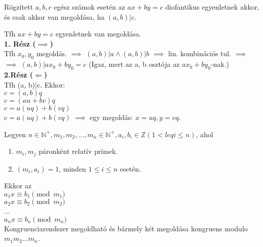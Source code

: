 \documentclass{beamer}
\begin{document}
\begin{frame}

\begin{tcolorbox}[title={Tétel: A diofantikus egyenlet megoldása}]
Rögzített $a, b, c$ egész számok esetén az \textbf{$ax + by = c$} diofantikus egyenletnek akkor, és csak akkor van megoldása, ha $(a, b)|c$.
\end{tcolorbox}

\begin{tcolorbox}[title={Bizonyítás}]
Tfh $ax + by = c$ egyenletnek van megoldása.\\
\textbf{1. Rész ($\implies$)}\\
\smallskip
Tfh $x_0, y_0$ megoldás. $\implies$ $(a, b)|a \land (a, b)|b$ $\implies$ lin. kombinációs tul. $\implies$\\
$\implies$ $(a, b)|ax_0 + by_0 = c$ (Igaz, mert az a, b osztója az $ax_0 + by_0$-nak.)\\
\bigskip
\textbf{2.Rész ($\Longleftarrow$)}\\
\smallskip
Tfh (a, b)|c. Ekkor:\\
$c = (a, b)q$\\
$c = (au + bv)q$\\
$c = a(uq) + b(vq)$\\
$c = a(uq) + b(vq)$ $\implies$ egy megoldás: $x = uq, y = vq$.\\

\end{tcolorbox}

\end{frame}

\begin{frame}

\begin{tcolorbox}[title={Tétel: Kínai maradéktétel}]
Legyen $n \in \mathbb{N}^+, m_1, m_2, ..., m_n \in \mathbb{N}^+, a_i, b_i \in \mathbb{Z} (1 <leq i \leq n)$, ahol
\begin{enumerate}
\item $m_i, m_j$ páronként relatív prímek.
\item $(m_i, a_i) = 1$, minden $1 \leq i \leq n$ esetén.
\end{enumerate}
Ekkor az\\
\bigskip
	$a_1x \equiv b_1 \pmod{m_1}$\\
	$a_2x \equiv b_2 \pmod{m_2}$\\
	...\\
	$a_nx \equiv b_n \pmod{m_n}$\\
\bigskip
Kongruenciarendszer megoldható és bármely két megoldása kongruens modulo $m_1m_2...m_n$.

\end{tcolorbox}

\end{frame}
\end{document}
